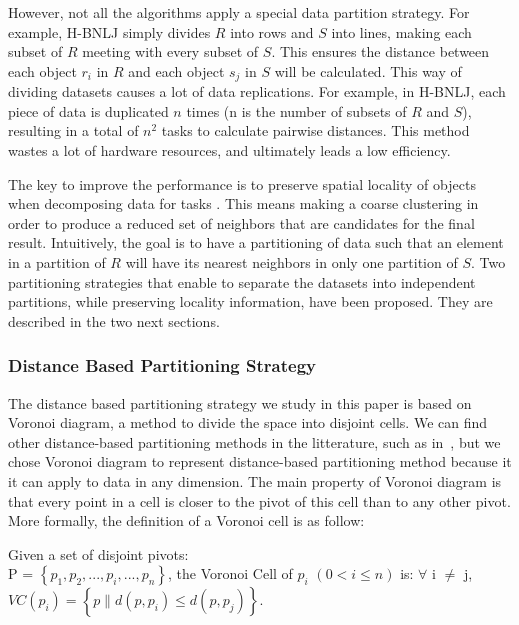 However, not all the algorithms apply a special data partition strategy. For example, H-BNLJ simply divides $R$ into rows and $S$ into lines, making each subset of $R$ meeting with every subset of $S$. This ensures the distance between each object $r_i$ in $R$ and each object $s_j$ in $S$ will be calculated. This way of dividing datasets causes a lot of data replications. For example, in H-BNLJ, each piece of data is duplicated $n$ times (n is the number of subsets of $R$ and $S$), resulting in a total of $n^2$ tasks to calculate pairwise distances. This method wastes a lot of hardware resources, and ultimately leads a low  efficiency.

The key to improve the performance is to preserve spatial locality of objects when decomposing data for tasks \cite{Zhou:1998:DPP:594718.594759}. This means making a coarse clustering in order to produce a reduced set of neighbors that are candidates for the final result. Intuitively, the goal is to have a partitioning of data such that an element in a partition of $R$ will have its nearest neighbors in only one partition of $S$. 
Two partitioning strategies that enable to separate the datasets into independent partitions, while preserving locality 
information, have 
been proposed. They are described in the two next sections. 

\subsubsection{Distance Based Partitioning Strategy}
The distance based partitioning strategy we study in this paper is based on Voronoi diagram, a method to divide the space into disjoint cells. We can find other distance-based partitioning methods in the litterature, such as in~\cite{Ji:2012:IGK:2408853.2408998}, but we chose Voronoi diagram to represent distance-based partitioning method because it it can apply to data in any dimension. 
The main property of Voronoi diagram 
is that every point in a cell is
closer to the pivot of this cell than to any other pivot. More formally, the 
definition of a Voronoi cell is as follow:
\begin{myDef}
Given a set of disjoint pivots: \\ P = $\left\{ p_1, p_2, ..., p_i, ..., p_n \right\}$, the Voronoi Cell of $p_i$ $\left(0 < 
i \leq n \right)$ is: $
\forall$ i $\neq$ j, $VC\left(p_i\right) = \left\{p \| d\left(p, p_i\right) \leq d\left(p, p_j\right) \right\}$. 
\end{myDef}


